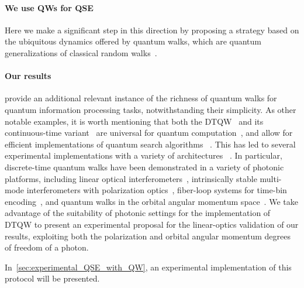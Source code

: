 \paragraph{We use QWs for QSE}
Here we make a significant step in this direction by proposing a strategy based on the ubiquitous dynamics offered by quantum walks, which are quantum generalizations of classical random walks~\cite{aharonov1993quantum, nayak2000quantum, ambainis2001onedimensional, kempe2003quantum, venegasandraca2012quantum}.


\paragraph{Our results}
provide an additional relevant instance of the richness of quantum walks for quantum information processing tasks, notwithstanding their simplicity.
As other notable examples, it is worth mentioning that both the DTQW~\cite{aharonov1993quantum} and its continuous-time variant~\cite{farhi1998quantum} are universal for quantum computation~\cite{childs2009universal,childs2013universal},
and allow for efficient implementations of quantum search algorithms~%
\cite{shenvi2003quantum,ambainis2005coins,tulsi2008faster}.
This has led to several experimental implementations with a variety of architectures~%
\cite{ct2006quantum, schwartz2007transport, chandrashekar2008quantum, perets2008realization, karski2009quantum, schmitz2009quantum, zhringer2010realization, peruzzo2010quantum, owens2011twophoton, weitenberg2011singlespin, giuseppe2013einsteinpodolskyrosen, fukuhara2013microscopic, poulios2014quantum, preiss2015strongly, chapman2016experimental, caruso2016fast}.
In particular, discrete-time quantum walks have been demonstrated in a variety of photonic platforms,
including linear optical interferometers~\cite{sansoni2012twoparticle,crespi2013anderson,harris2015bosonic,pitsios2016photonic},
intrinsically stable multi-mode interferometers with polarization optics~\cite{broome2010discrete,kitagawa2012observation,vitelli2013joining},
fiber-loop systems for time-bin encoding~\cite{schreiber2010photons,schreiber2012a,boutari2016large},
and quantum walks in the orbital angular momentum space~\cite{cardano2015quantum,cardano2016statistical}.
We take advantage of the suitability of photonic settings for the implementation of DTQW to present an experimental proposal for the linear-optics validation of our results, exploiting both the polarization and orbital angular momentum degrees of freedom of a photon.

In~\cref{sec:experimental_QSE_with_QW}, an experimental implementation of this protocol will be presented.

